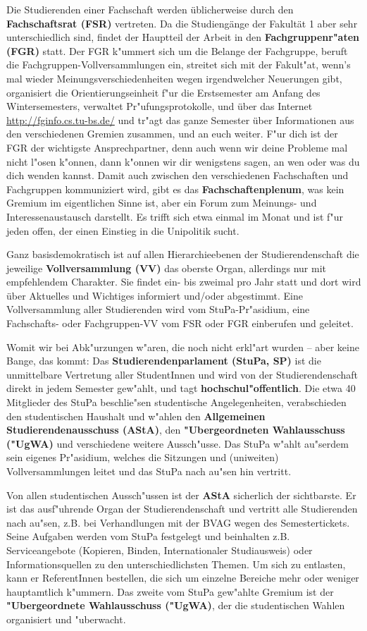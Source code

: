 \begin{multicols}{2}
		Die Studierenden einer Fachschaft werden üblicherweise durch den \textbf{Fachschaftsrat (FSR)} vertreten. Da die Studiengänge der Fakultät 1 aber sehr unterschiedlich sind, findet der Hauptteil der Arbeit in den \textbf{Fachgruppenr"aten (FGR)} statt. Der FGR k"ummert sich um die Belange der Fachgruppe, beruft die Fachgruppen-Vollversammlungen ein, streitet sich mit der Fakult"at, wenn's mal wieder Meinungsverschiedenheiten wegen irgendwelcher Neuerungen gibt, organisiert die Orientierungseinheit f"ur die Erstsemester am Anfang des Wintersemesters, verwaltet Pr"ufungsprotokolle, und über das Internet \url{http://fginfo.cs.tu-bs.de/} und tr"agt das ganze Semester über Informationen aus den verschiedenen Gremien zusammen, und an euch weiter. F"ur dich ist der FGR der wichtigste Ansprechpartner, denn auch wenn wir deine Probleme mal nicht l"osen k"onnen, dann k"onnen wir dir wenigstens sagen, an wen oder was du dich wenden kannst. Damit auch zwischen den verschiedenen Fachschaften und Fachgruppen kommuniziert wird, gibt es das \textbf{Fachschaftenplenum}, was kein Gremium im eigentlichen Sinne ist, aber ein Forum zum Meinungs- und Interessenaustausch darstellt. Es trifft sich etwa einmal im Monat und ist f"ur jeden offen, der einen Einstieg in die Unipolitik sucht.

		Ganz basisdemokratisch ist auf allen Hierarchie\-ebenen der Studierendenschaft die jeweilige \textbf{Vollversammlung (VV)} das oberste Organ, allerdings nur mit empfehlendem Charakter. Sie findet ein- bis zweimal pro Jahr statt und dort wird über Aktuelles und Wichtiges informiert und/oder abgestimmt. Eine Vollversammlung aller Studierenden wird vom StuPa-Pr"asidium, eine Fachschafts- oder Fachgruppen-VV vom FSR oder FGR einberufen und geleitet.

		Womit wir bei Abk"urzungen w"aren, die noch nicht erkl"art wurden -- aber keine Bange, das kommt: Das \textbf{Studierendenparlament (StuPa, SP)} ist die unmittelbare Vertretung aller StudentInnen und wird von der Studierendenschaft direkt in jedem Semester gew"ahlt, und tagt \textbf{hochschul"offentlich}. Die etwa 40 Mitglieder des StuPa beschlie"sen studentische Angelegenheiten, verabschieden den studentischen Haushalt und w"ahlen den \textbf{Allgemeinen Studierendenausschuss (AStA)}, den \textbf{"Ubergeordneten Wahlausschuss ("UgWA)} und verschiedene weitere Aussch"usse. Das StuPa w"ahlt au"serdem sein eigenes Pr"asidium, welches die Sitzungen und (uniweiten) Vollversammlungen leitet und das StuPa nach au"sen hin vertritt.

		Von allen studentischen Aussch"ussen ist der \textbf{AStA} sicherlich der sichtbarste. Er ist das ausf"uhrende Organ der Studierendenschaft und vertritt alle Studierenden nach au"sen, z.B. bei Verhandlungen mit der BVAG wegen des Semestertickets. Seine Aufgaben werden vom StuPa festgelegt und beinhalten z.B. Serviceangebote (Kopieren, Binden, Internationaler Studiausweis) oder Informationsquellen zu den unterschiedlichsten Themen. Um sich zu entlasten, kann er ReferentInnen bestellen, die sich um einzelne Bereiche mehr oder weniger hauptamtlich k"ummern. Das zweite vom StuPa gew"ahlte Gremium ist der \textbf{"Ubergeordnete Wahlausschuss ("UgWA)}, der die studentischen Wahlen organisiert und "uberwacht.


\end{multicols}
